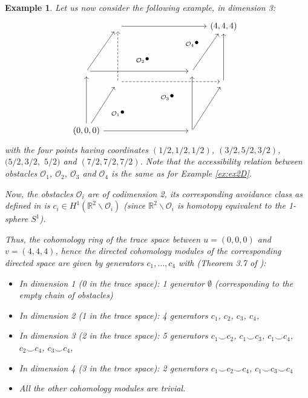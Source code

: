 \documentclass{article}
\def\R{\mbox{$\mathbb{R}$}}
\newtheorem{example}[definition]{Example} %
\begin{document}
\begin{example}
\label{ex:3D}
Let us now consider the following example, in dimension 3: 
\[
\begin{tikzcd}[column sep=0.5em, row sep=0.5em]
& \arrow{rrrr} & & & & (4,4,4) \\
& & & & { }_{\mathcal{O}_4} \bullet & \\
& & { }_{\mathcal{O}_2} \bullet & & \\
 \arrow{uuur}\arrow{rrrr} & & & & \arrow{uuur} \\
& \arrow[dashed]{uuuu}\arrow[dashed]{rrrr} & & &  & \arrow{uuuu} & \\
& & & { }_{\mathcal{O}_3} \bullet & & \\
& { }_{\mathcal{O}_1} \bullet & & & & \\
(0,0,0) \arrow{uuuu}\arrow{uuur}\arrow{rrrr} & & & & \arrow{uuuu}\arrow{uuur}
\end{tikzcd}
\]
\noindent with the four points having coordinates $(1/2,1/2,1/2)$, $(3/2,5/2,3/2)$, $(5/2,3/2,$ $5/2)$ and $(7/2,7/2,7/2)$. 
Note that the accessibility relation between obstacles $\mathcal{O}_1$, $\mathcal{O}_2$, $\mathcal{O}_3$ and $\mathcal{O}_4$ is the same as for Example \ref{ex:ex2D}. 

Now, the obstacles $\mathcal{O}_i$ are of codimension 2, its corresponding avoidance class as defined in \cite{Barychnikov} is 
$c_i \in H^1(\R^2\backslash \mathcal{O}_i)$ (since $\R^2\backslash \mathcal{O}_i$ is homotopy equivalent to the 1-sphere $S^1$). 

Thus, the {cohomology ring of the trace space between $u=(0,0,0)$ and $v=(4,4,4)$}, hence the directed cohomology modules of the corresponding directed space 
are given by generators $c_1,\ldots, c_4$ with (Theorem 3.7 of \cite{Barychnikov}):
\begin{itemize}
\item In dimension 1 (0 in the trace space): 1 generator $\emptyset$ (corresponding to the empty chain of obstacles)
\item In dimension 2 (1 in the trace space): 4 generators $c_1$, $c_2$, $c_3$, $c_4$,
\item In dimension 3 (2 in the trace space): 5 generators $c_1 \smile c_2$, $c_1 \smile c_3$, $c_1\smile c_4$, $c_2\smile c_4$, $c_3\smile c_4$,
\item In dimension 4 (3 in the trace space): 2 generators $c_1 \smile c_2 \smile c_4$, $c_1 \smile c_3 \smile c_4$
\item All the other cohomology modules are trivial. 
\end{itemize}


\end{example}
\end{document}
